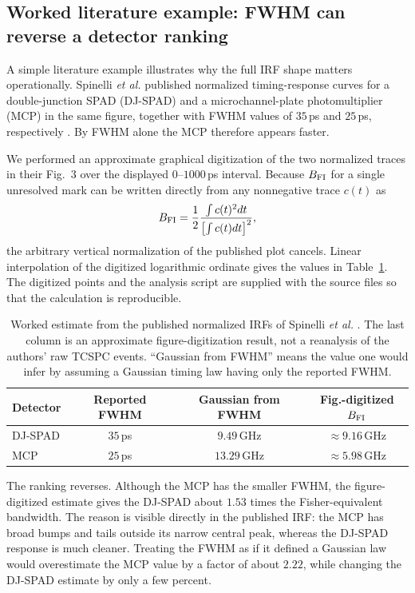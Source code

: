 \subsection{Worked literature example: FWHM can reverse a detector ranking}
\label{sec:workedIRF}

A simple literature example illustrates why the full IRF shape matters operationally. Spinelli \emph{et al.} published normalized timing-response curves for a double-junction SPAD (DJ-SPAD) and a microchannel-plate photomultiplier (MCP) in the same figure, together with FWHM values of $35\,$ps and $25\,$ps, respectively \cite{Spinelli1998}. By FWHM alone the MCP therefore appears faster.

We performed an approximate graphical digitization of the two normalized traces in their Fig.~3 over the displayed $0$--$1000\,$ps interval. Because $B_{\rm FI}$ for a single unresolved mark can be written directly from any nonnegative trace $c(t)$ as
\begin{equation}
B_{\rm FI}
=\frac12\frac{\int c(t)^2dt}{\left[\int c(t)dt\right]^2},
\label{eq:traceBFI}
\end{equation}
the arbitrary vertical normalization of the published plot cancels. Linear interpolation of the digitized logarithmic ordinate gives the values in Table~\ref{tab:spinelliWorkedExample}. The digitized points and the analysis script are supplied with the source files so that the calculation is reproducible.

\begin{table}[t]
\caption{Worked estimate from the published normalized IRFs of Spinelli \emph{et al.} \cite{Spinelli1998}. The last column is an approximate figure-digitization result, not a reanalysis of the authors' raw TCSPC events. ``Gaussian from FWHM'' means the value one would infer by assuming a Gaussian timing law having only the reported FWHM.}
\label{tab:spinelliWorkedExample}
\begin{tabular}{lccc}
\toprule
Detector & Reported FWHM & Gaussian from FWHM & Fig.-digitized $B_{\rm FI}$ \\
\midrule
DJ-SPAD & $35\,$ps & $9.49\,$GHz & $\approx9.16\,$GHz \\
MCP & $25\,$ps & $13.29\,$GHz & $\approx5.98\,$GHz \\
\bottomrule
\end{tabular}
\end{table}

The ranking reverses. Although the MCP has the smaller FWHM, the figure-digitized estimate gives the DJ-SPAD about $1.53$ times the Fisher-equivalent bandwidth. The reason is visible directly in the published IRF: the MCP has broad bumps and tails outside its narrow central peak, whereas the DJ-SPAD response is much cleaner. Treating the FWHM as if it defined a Gaussian law would overestimate the MCP value by a factor of about $2.22$, while changing the DJ-SPAD estimate by only a few percent.

